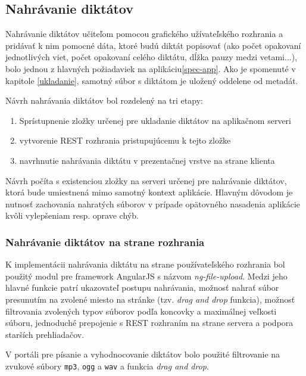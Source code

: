 \documentclass[12pt,oneside]{fithesis2}
\begin{document}
		\subsection{Nahrávanie diktátov}
   \par Nahrávanie diktátov učiteľom pomocou grafického užívateľského rozhrania a pridávať k nim pomocné dáta, ktoré budú diktát popisovať (ako počet opakovaní jednotlivých viet, počet opakovaní celého diktátu, dĺžka pauzy medzi vetami...), bolo jednou z hlavných požiadaviek na aplikáciu\ref{spec-app}. Ako je spomenuté v kapitole \ref{ukladanie}, samotný súbor s diktátom je uložený oddelene od metadát.
   \par Návrh nahrávania diktátov bol rozdelený na tri etapy:
   \begin{enumerate}
   		\item Sprístupnenie zložky určenej pre ukladanie diktátov na aplikačnom serveri
   		\item vytvorenie REST rozhrania pristupujúcemu k tejto zložke
   		\item navrhnutie nahrávania diktátu v prezentačnej vrstve na strane klienta
   \end{enumerate}
   \par Návrh počíta s existenciou zložky na serveri určenej pre nahrávanie diktátov, ktorá bude umiestnená mimo samotný kontext aplikácie. Hlavným dôvodom je nutnosť zachovania nahratých súborov v prípade opätovného nasadenia aplikácie kvôli vylepšeniam resp. oprave chýb. 
   
		\subsubsection{Nahrávanie diktátov na strane rozhrania}
	\par K implementácii nahrávania diktátu na strane používateľského rozhrania bol použitý modul pre framework AngularJS s názvom \textit{ng-file-upload}. Medzi jeho hlavné funkcie patrí ukazovateľ postupu nahrávania, možnosť nahrať súbor presunutím na zvolené miesto na stránke (tzv. \textit{drag and drop} funkcia), možnosť filtrovania zvolených typov súborov podľa koncovky a maximálnej veľkosti súboru, jednoduché prepojenie s REST rozhraním na strane servera a podpora starších prehliadačov\cite{fileupload}.
	\par V portáli pre písanie a vyhodnocovanie diktátov bolo použité filtrovanie na zvukové súbory \texttt{mp3}, \texttt{ogg} a \texttt{wav} a funkcia \textit{drag and drop}.
	
\end{document}
